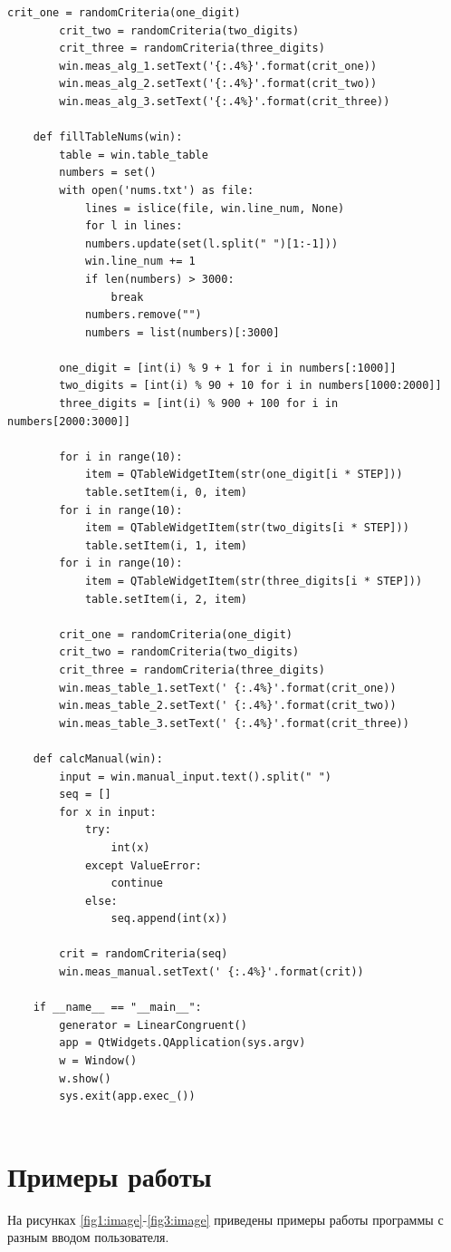 \documentclass[12pt,a4paper,oneside]{report}
\begin{document}
\begin{lstlisting}[label=code, caption = Текст программы]
		crit_one = randomCriteria(one_digit)
		crit_two = randomCriteria(two_digits)
		crit_three = randomCriteria(three_digits)
		win.meas_alg_1.setText('{:.4%}'.format(crit_one))
		win.meas_alg_2.setText('{:.4%}'.format(crit_two))
		win.meas_alg_3.setText('{:.4%}'.format(crit_three))
	
	def fillTableNums(win):
		table = win.table_table
		numbers = set()
		with open('nums.txt') as file:
			lines = islice(file, win.line_num, None)
			for l in lines:
			numbers.update(set(l.split(" ")[1:-1]))
			win.line_num += 1
			if len(numbers) > 3000:
				break
			numbers.remove("")
			numbers = list(numbers)[:3000]
		
		one_digit = [int(i) % 9 + 1 for i in numbers[:1000]]
		two_digits = [int(i) % 90 + 10 for i in numbers[1000:2000]]
		three_digits = [int(i) % 900 + 100 for i in numbers[2000:3000]]
		
		for i in range(10):
			item = QTableWidgetItem(str(one_digit[i * STEP]))
			table.setItem(i, 0, item)
		for i in range(10):
			item = QTableWidgetItem(str(two_digits[i * STEP]))
			table.setItem(i, 1, item)
		for i in range(10):
			item = QTableWidgetItem(str(three_digits[i * STEP]))
			table.setItem(i, 2, item)
		
		crit_one = randomCriteria(one_digit)
		crit_two = randomCriteria(two_digits)
		crit_three = randomCriteria(three_digits)
		win.meas_table_1.setText(' {:.4%}'.format(crit_one))
		win.meas_table_2.setText(' {:.4%}'.format(crit_two))
		win.meas_table_3.setText(' {:.4%}'.format(crit_three))
	
	def calcManual(win):
		input = win.manual_input.text().split(" ")
		seq = []
		for x in input:
			try:
				int(x)
			except ValueError:
				continue
			else:
				seq.append(int(x))
	
		crit = randomCriteria(seq)
		win.meas_manual.setText(' {:.4%}'.format(crit))
	
	if __name__ == "__main__":
		generator = LinearCongruent()
		app = QtWidgets.QApplication(sys.argv)
		w = Window()
		w.show()
		sys.exit(app.exec_())
		
	\end{lstlisting}
	
	
	
	\section*{Примеры работы}
	
	\quad На рисунках \ref{fig1:image}-\ref{fig3:image} приведены примеры работы программы с разным вводом пользователя.
	
\end{document}
